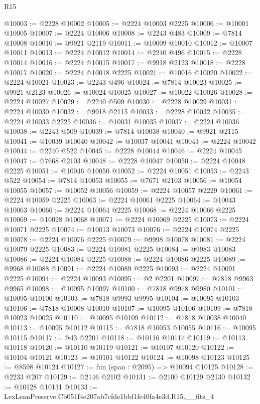 \begin{lexlean}{R15}
\begin{coremodule}
@10003 := @2228 @10002
@10005 := @2224 @10003 @2225
@10006 := @10001 @10005
@10007 := @2224 @10006
@10008 := @2243 @483
@10009 := @7814 @10008
@10010 := @9921 @2119
@10011 := @10009 @10010
@10012 := @10007 @10011
@10013 := @2224 @10012
@10014 := @2240 @496
@10015 := @2228 @10014
@10016 := @2224 @10015
@10017 := @9918 @2123
@10018 := @2228 @10017
@10020 := @2224 @10018 @2225
@10021 := @10016 @10020
@10022 := @2224 @10021
@10023 := @2243 @496
@10024 := @7814 @10023
@10025 := @9921 @2123
@10026 := @10024 @10025
@10027 := @10022 @10026
@10028 := @2224 @10027
@10029 := @2240 @509
@10030 := @2228 @10029
@10031 := @2224 @10030
@10032 := @9918 @2115
@10033 := @2228 @10032
@10035 := @2224 @10033 @2225
@10036 := @10031 @10035
@10037 := @2224 @10036
@10038 := @2243 @509
@10039 := @7814 @10038
@10040 := @9921 @2115
@10041 := @10039 @10040
@10042 := @10037 @10041
@10043 := @2224 @10042
@10044 := @2240 @522
@10045 := @2228 @10044
@10046 := @2224 @10045
@10047 := @7668 @2103
@10048 := @2228 @10047
@10050 := @2224 @10048 @2225
@10051 := @10046 @10050
@10052 := @2224 @10051
@10053 := @2243 @522
@10054 := @7814 @10053
@10055 := @7671 @2103
@10056 := @10054 @10055
@10057 := @10052 @10056
@10059 := @2224 @10057 @2229
@10061 := @2224 @10059 @2225
@10063 := @2224 @10061 @2225
@10064 := @10043 @10063
@10066 := @2224 @10064 @2225
@10068 := @2224 @10066 @2225
@10069 := @10028 @10068
@10071 := @2224 @10069 @2225
@10073 := @2224 @10071 @2225
@10074 := @10013 @10073
@10076 := @2224 @10074 @2225
@10078 := @2224 @10076 @2225
@10079 := @9998 @10078
@10081 := @2224 @10079 @2225
@10083 := @2224 @10081 @2225
@10084 := @9983 @10083
@10086 := @2224 @10084 @2225
@10088 := @2224 @10086 @2225
@10089 := @9968 @10088
@10091 := @2224 @10089 @2225
@10093 := @2224 @10091 @2225
@10094 := @2224 @10093
@10095 := @2 @2201
@10097 := @7818 @9963 @9965
@10098 := @10095 @10097
@10100 := @7818 @9978 @9980
@10101 := @10095 @10100
@10103 := @7818 @9993 @9995
@10104 := @10095 @10103
@10106 := @7818 @10008 @10010
@10107 := @10095 @10106
@10109 := @7818 @10023 @10025
@10110 := @10095 @10109
@10112 := @7818 @10038 @10040
@10113 := @10095 @10112
@10115 := @7818 @10053 @10055
@10116 := @10095 @10115
@10117 := @43 @2201
@10118 := @10116 @10117
@10119 := @10113 @10118
@10120 := @10110 @10119
@10121 := @10107 @10120
@10122 := @10104 @10121
@10123 := @10101 @10122
@10124 := @10098 @10123
@10125 := @8598 @10124
@10127 := fun (span : @2095) => @10094 @10125
@10128 := @2233 @207
@10129 := @2146 @2102
@10131 := @2100 @10129 @2130
@10132 := @10128 @10131
@10133 := LexLeanPreserve.Cb051f4e207ab7cfde1bbf1fe40fa4e3d.R15.__fits_4

\end{coremodule}
\end{lexlean}
